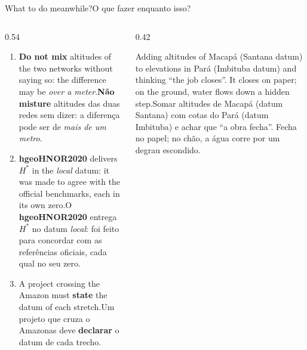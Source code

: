 \documentclass[aspectratio=169,11pt]{beamer}
\newcommand{\tr}[2]{\ifEN#2\else#1\fi}
\newcommand{\bnum}[1]{\ifmmode\textcolor{mTeal}{\mathbf{#1}}\else\textbf{\textcolor{mTeal}{#1}}\fi}
\begin{document}
\begin{frame}{\tr{O que fazer enquanto isso?}{What to do meanwhile?}}
  \begin{columns}[T]
    \begin{column}{0.54\textwidth}
      \small
      \begin{enumerate}
        \setlength{\itemsep}{4pt}
        \item \tr{\textbf{Não misture} altitudes das duas redes sem dizer: a diferença pode ser de
              \emph{mais de um metro}.}{\textbf{Do not mix} altitudes of the two networks without
              saying so: the difference may be \emph{over a meter}.}
        \item \tr{O \textbf{hgeoHNOR2020} entrega $H^{*}$ no datum \emph{local}: foi feito para
              concordar com as referências oficiais, cada qual no seu zero.}{\textbf{hgeoHNOR2020}
              delivers $H^{*}$ in the \emph{local} datum: it was made to agree with the official
              benchmarks, each in its own zero.}
        \item \tr{Um projeto que cruza o Amazonas deve \bnum{declarar} o datum de cada trecho.}{A
              project crossing the Amazon must \bnum{state} the datum of each stretch.}
      \end{enumerate}
    \end{column}
    \begin{column}{0.42\textwidth}
      \begin{cuidado}[title={\tr{O erro clássico}{The classic mistake}}]
        \small\tr{Somar altitudes de Macapá (datum Santana) com cotas do Pará (datum Imbituba) e
        achar que ``a obra fecha''. Fecha no papel; no chão, a água corre por um degrau
        escondido.}{Adding altitudes of Macapá (Santana datum) to elevations in Pará (Imbituba
        datum) and thinking ``the job closes''. It closes on paper; on the ground, water flows
        down a hidden step.}
      \end{cuidado}
    \end{column}
  \end{columns}
\end{frame}
\end{document}
